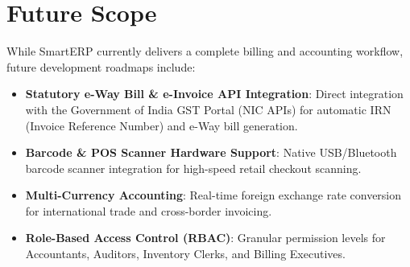 \section{Future Scope}
While SmartERP currently delivers a complete billing and accounting workflow, future development roadmaps include:
\begin{itemize}
    \item \textbf{Statutory e-Way Bill \& e-Invoice API Integration}: Direct integration with the Government of India GST Portal (NIC APIs) for automatic IRN (Invoice Reference Number) and e-Way bill generation.
    \item \textbf{Barcode \& POS Scanner Hardware Support}: Native USB/Bluetooth barcode scanner integration for high-speed retail checkout scanning.
    \item \textbf{Multi-Currency Accounting}: Real-time foreign exchange rate conversion for international trade and cross-border invoicing.
    \item \textbf{Role-Based Access Control (RBAC)}: Granular permission levels for Accountants, Auditors, Inventory Clerks, and Billing Executives.
\end{itemize}
